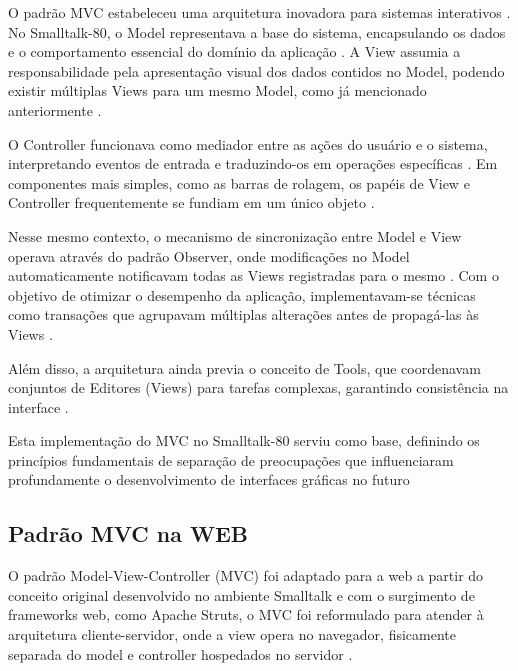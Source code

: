             \par O padrão MVC estabeleceu uma arquitetura inovadora para sistemas interativos \cite{artigo:reenskaug:2003}. No Smalltalk-80, o Model representava a base do sistema, encapsulando os dados e o comportamento essencial do domínio da aplicação \cite{artigo:reenskaug:2003}. A View assumia a responsabilidade pela apresentação visual dos dados contidos no Model, podendo existir múltiplas Views para um mesmo Model, como já mencionado anteriormente \cite{artigo:reenskaug:2003}. 
            
            \par O Controller funcionava como mediador entre as ações do usuário e o sistema, interpretando eventos de entrada e traduzindo-os em operações específicas \cite{artigo:reenskaug:2003}. Em componentes mais simples, como as barras de rolagem, os papéis de View e Controller frequentemente se fundiam em um único objeto \cite{artigo:reenskaug:2003}.

            \par Nesse mesmo contexto, o mecanismo de sincronização entre Model e View operava através do padrão Observer, onde modificações no Model automaticamente notificavam todas as Views registradas para o mesmo \cite{artigo:reenskaug:2003}. Com o objetivo de otimizar o desempenho da aplicação, implementavam-se técnicas como transações que agrupavam múltiplas alterações antes de propagá-las às Views \cite{artigo:reenskaug:2003}.
            
            \par Além disso, a arquitetura ainda previa o conceito de Tools, que coordenavam conjuntos de Editores (Views) para tarefas complexas, garantindo consistência na interface \cite{artigo:reenskaug:2003}. 
            
            \par Esta implementação do MVC no Smalltalk-80 serviu como base, definindo os princípios fundamentais de separação de preocupações que influenciaram profundamente o desenvolvimento de interfaces gráficas no futuro \cite{artigo:reenskaug:2003}
            
    
    \subsection{Padrão MVC na WEB}

        \par O padrão Model-View-Controller (MVC) foi adaptado para a web a partir do conceito original desenvolvido no ambiente Smalltalk e com o surgimento de frameworks web, como Apache Struts, o MVC foi reformulado para atender à arquitetura cliente-servidor, onde a view opera no navegador, fisicamente separada do model e controller hospedados no servidor \cite{inproceedings:grove:2011}. 
        
